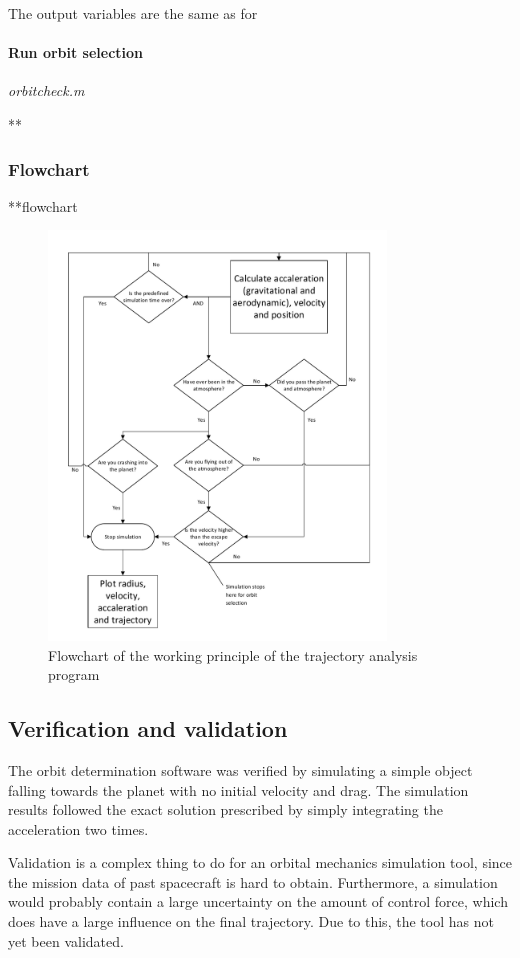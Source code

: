 The output variables are the same as for 

\paragraph{Run orbit selection} \textit{orbitcheck.m}

**

\subsubsection{Flowchart} \label{subsec:flow}
**flowchart

\begin{figure}[H]
\centering
\hspace{-23mm}
\includegraphics[width = 0.8\textwidth]{Figure/astro_tool.pdf}
\vspace{-5mm}
\caption{Flowchart of the working principle of the trajectory analysis program}
\label{fig:traj_flow}
\end{figure}

\subsection{Verification and validation}
The orbit determination software was verified by simulating a simple object falling towards the planet with no initial velocity and drag. The simulation results followed the exact solution prescribed by simply integrating the acceleration two times.

Validation is a complex thing to do for an orbital mechanics simulation tool, since the mission data of past spacecraft is hard to obtain. Furthermore, a simulation would probably contain a large uncertainty on the amount of control force, which does have a large influence on the final trajectory. Due to this, the tool has not yet been validated.

